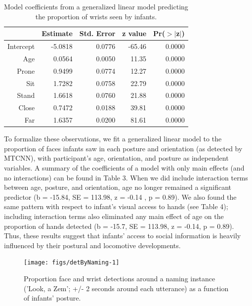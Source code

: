 \documentclass[10pt, letterpaper]{article}
\newenvironment{CodeChunk}{}{}
\begin{document}
\begin{table}[H]
\centering
\begin{tabular}{rrrrr}
  \hline
 & Estimate & Std. Error & z value & Pr($>$$|$z$|$) \\ 
  \hline
Intercept & -5.0818 & 0.0776 & -65.46 & 0.0000 \\ 
  Age & 0.0564 & 0.0050 & 11.35 & 0.0000 \\ 
  Prone & 0.9499 & 0.0774 & 12.27 & 0.0000 \\ 
  Sit & 1.7282 & 0.0758 & 22.79 & 0.0000 \\ 
  Stand & 1.6618 & 0.0760 & 21.88 & 0.0000 \\ 
  Close & 0.7472 & 0.0188 & 39.81 & 0.0000 \\ 
  Far & 1.6357 & 0.0200 & 81.61 & 0.0000 \\ 
   \hline
\end{tabular}
\caption{Model coefficients from a generalized linear model predicting the proportion of wrists seen by infants.} 
\end{table}

To formalize these observations, we fit a generalized linear model to
the proportion of faces infants saw in each posture and orientation (as
detected by MTCNN), with participant's age, orientation, and posture as
independent variables. A summary of the coefficients of a model with
only main effects (and no interactions) can be found in Table 3. When we
did include interaction terms between age, posture, and orientation, age
no longer remained a significant predictor (b = -15.84, SE = 113.98, z =
-0.14 , p = 0.89). We also found the same pattern with respect to
infant's visual access to hands (see Table 4); including interaction
terms also eliminated any main effect of age on the proportion of hands
detected (b = -15.7, SE = 113.98, z = -0.14, p = 0.89). Thus, these
results suggest that infants' access to social information is heavily
influenced by their postural and locomotive developments.

\begin{CodeChunk}
\begin{figure}[H]

{\centering \texttt{[image: figs/detByNaming-1]} 

}

\caption[Proportion face and wrist detections around a naming instance ('Look, a Zem']{Proportion face and wrist detections around a naming instance ('Look, a Zem'; +/- 2 seconds around each utterance) as a function of infants' posture.}\label{fig:detByNaming}
\end{figure}
\end{CodeChunk}
\end{document}
